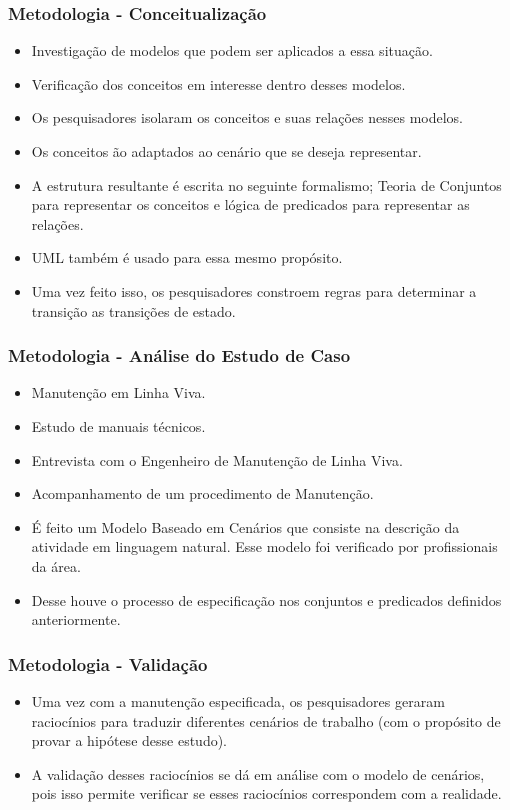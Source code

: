 \documentclass{beamer}
\begin{document}
\begin{frame}
	\frametitle{Metodologia - Conceitualização}
	\begin{itemize}
		\item Investigação de modelos que podem ser aplicados a essa situação.
		\item Verificação dos conceitos em interesse dentro desses modelos. 
		\item Os pesquisadores isolaram os conceitos e suas relações nesses modelos. 
		\item Os conceitos ão adaptados ao cenário que se deseja representar.
		\item A estrutura resultante é escrita no seguinte formalismo; Teoria de Conjuntos para representar os conceitos e lógica de predicados para representar as relações. 
		\item UML também é usado para essa mesmo propósito. 
		\item Uma vez feito isso, os pesquisadores constroem regras para determinar a transição as transições de estado.
	\end{itemize} 
\end{frame}

\begin{frame}
	\frametitle{Metodologia - Análise do Estudo de Caso}
	\begin{itemize}
		\item Manutenção em Linha Viva. 
		\item Estudo de manuais técnicos. 
		\item Entrevista com o Engenheiro de Manutenção de Linha Viva. 
		\item Acompanhamento de um procedimento de Manutenção. 
		\item É feito um Modelo Baseado em Cenários que consiste na descrição da atividade em linguagem natural. Esse modelo foi verificado por profissionais da área. 
		\item Desse houve o processo de especificação nos conjuntos e predicados definidos anteriormente. 
	\end{itemize} 
\end{frame}

\begin{frame}
	\frametitle{Metodologia - Validação}
	\begin{itemize}
		\item Uma vez com a manutenção especificada, os pesquisadores geraram raciocínios para traduzir diferentes cenários de trabalho (com o propósito de provar a hipótese desse estudo). 
		\item A validação desses raciocínios se dá em análise com o modelo de cenários, pois isso permite verificar se esses raciocínios correspondem com a realidade. 
	\end{itemize} 
\end{frame}
\end{document}
